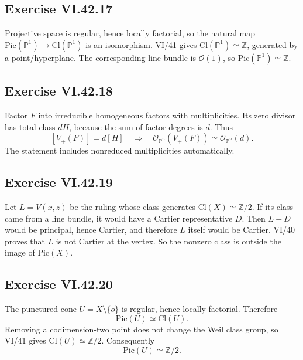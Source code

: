 \subsection*{Exercise VI.42.17}
\begin{solution}
Projective space is regular, hence locally factorial, so the natural map \(\mathrm{Pic}(\mathbb P^1)\to\mathrm{Cl}(\mathbb P^1)\) is an isomorphism.  VI/41 gives \(\mathrm{Cl}(\mathbb P^1)\simeq\mathbb Z\), generated by a point/hyperplane.  The corresponding line bundle is \(\mathcal O(1)\), so \(\mathrm{Pic}(\mathbb P^1)\simeq\mathbb Z\).
\end{solution}

\subsection*{Exercise VI.42.18}
\begin{solution}
Factor \(F\) into irreducible homogeneous factors with multiplicities.  Its zero divisor has total class \(dH\), because the sum of factor degrees is \(d\).  Thus
\[
[V_+(F)]=d[H]
\quad\Longrightarrow\quad
\mathcal O_{\mathbb P^n}(V_+(F))\simeq\mathcal O_{\mathbb P^n}(d).
\]
The statement includes nonreduced multiplicities automatically.
\end{solution}

\subsection*{Exercise VI.42.19}
\begin{solution}
Let \(L=V(x,z)\) be the ruling whose class generates \(\mathrm{Cl}(X)\simeq\mathbb Z/2\).  If its class came from a line bundle, it would have a Cartier representative \(D\).  Then \(L-D\) would be principal, hence Cartier, and therefore \(L\) itself would be Cartier.  VI/40 proves that \(L\) is not Cartier at the vertex.  So the nonzero class is outside the image of \(\mathrm{Pic}(X)\).
\end{solution}

\subsection*{Exercise VI.42.20}
\begin{solution}
The punctured cone \(U=X\setminus\{o\}\) is regular, hence locally factorial.  Therefore
\[
\mathrm{Pic}(U)\simeq\mathrm{Cl}(U).
\]
Removing a codimension-two point does not change the Weil class group, so VI/41 gives \(\mathrm{Cl}(U)\simeq\mathbb Z/2\).  Consequently
\[
\mathrm{Pic}(U)\simeq\mathbb Z/2.
\]
\end{solution}

